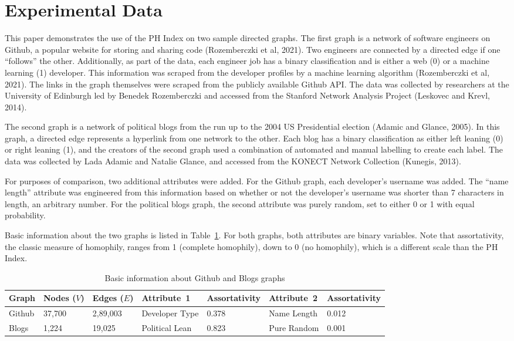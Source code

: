 \documentclass{article}
\begin{document}
\section{Experimental Data}

This paper demonstrates the use of the PH Index on two sample directed
graphs. The first graph is a network of software engineers on Github, a
popular website for storing and sharing code (Rozemberczki et al, 2021).
Two engineers are connected by a directed edge if one ``follows'' the
other. Additionally, as part of the data, each engineer job has a binary
classification and is either a web (0) or a machine learning (1)
developer. This information was scraped from the developer profiles by a
machine learning algorithm (Rozemberczki et al, 2021). The links in the
graph themselves were scraped from the publicly available Github API.
The data was collected by researchers at the University of Edinburgh led
by Benedek Rozemberczki and accessed from the Stanford Network Analysis
Project (Leskovec and Krevl, 2014).

The second graph is a network of political blogs from the run up to the
2004 US Presidential election (Adamic and Glance, 2005). In this graph,
a directed edge represents a hyperlink from one network to the other.
Each blog has a binary classification as either left leaning (0) or
right leaning (1), and the creators of the second graph used a
combination of automated and manual labelling to create each label. The
data was collected by Lada Adamic and Natalie Glance, and accessed from
the KONECT Network Collection (Kunegis, 2013).

For purposes of comparison, two additional attributes were added. For
the Github graph, each developer's username was added. The ``name
length'' attribute was engineered from this information based on whether
or not the developer's username was shorter than 7 characters in length,
an arbitrary number. For the political blogs graph, the second attribute
was purely random, set to either 0 or 1 with equal probability.

Basic information about the two graphs is listed in Table~\ref{basic}. For both
graphs, both attributes are binary variables. Note that assortativity,
the classic measure of homophily, ranges from 1 (complete homophily),
down to 0 (no homophily), which is a different scale than the PH Index.

\begin{table}
\caption{Basic information about Github and Blogs
   graphs}
\label{basic}
\begin{tabularx}{\textwidth}{lXXXXXX}
\toprule
Graph &
Nodes ($V$)
& 
Edges ($E$)
 & 
Attri\-bute~1
 & 
Assorta\-tivity
 & 
Attri\-bute~2
 & 
Assorta\-tivity
 \\
\midrule
Github & 37,700 & 2,89,003 & Developer Type & 0.378 & Name Length
& 0.012 \\\addlinespace
Blogs & 1,224 & 19,025 & Political Lean & 0.823 & Pure Random &
0.001 \\
\bottomrule
\end{tabularx}
\end{table}
\end{document}
